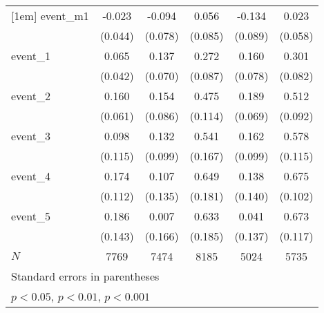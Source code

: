 {\begin{tabular}{l*{5}{c}}
[1em]
event\_m1    &      -0.023         &      -0.094         &       0.056         &      -0.134         &       0.023         \\
            &     (0.044)         &     (0.078)         &     (0.085)         &     (0.089)         &     (0.058)         \\
[1em]
event\_1     &       0.065         &       0.137         &       0.272\sym{**} &       0.160\sym{*}  &       0.301\sym{***}\\
            &     (0.042)         &     (0.070)         &     (0.087)         &     (0.078)         &     (0.082)         \\
[1em]
event\_2     &       0.160\sym{**} &       0.154         &       0.475\sym{***}&       0.189\sym{**} &       0.512\sym{***}\\
            &     (0.061)         &     (0.086)         &     (0.114)         &     (0.069)         &     (0.092)         \\
[1em]
event\_3     &       0.098         &       0.132         &       0.541\sym{**} &       0.162         &       0.578\sym{***}\\
            &     (0.115)         &     (0.099)         &     (0.167)         &     (0.099)         &     (0.115)         \\
[1em]
event\_4     &       0.174         &       0.107         &       0.649\sym{***}&       0.138         &       0.675\sym{***}\\
            &     (0.112)         &     (0.135)         &     (0.181)         &     (0.140)         &     (0.102)         \\
[1em]
event\_5     &       0.186         &       0.007         &       0.633\sym{***}&       0.041         &       0.673\sym{***}\\
            &     (0.143)         &     (0.166)         &     (0.185)         &     (0.137)         &     (0.117)         \\
\hline
\(N\)       &        7769         &        7474         &        8185         &        5024         &        5735         \\
\hline\hline
\multicolumn{6}{l}{\footnotesize Standard errors in parentheses}\\
\multicolumn{6}{l}{\footnotesize \sym{*} \(p<0.05\), \sym{**} \(p<0.01\), \sym{***} \(p<0.001\)}\\
\end{tabular}
}
